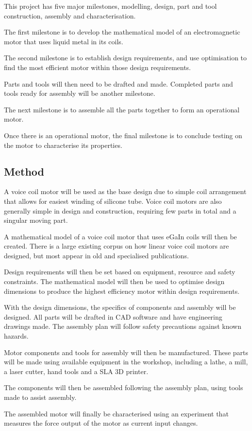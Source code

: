 \documentclass[a4paper,12pt]{article}
\begin{document}
This project has five major milestones, modelling, design, part and tool construction, assembly and characterisation.

The first milestone is to develop the mathematical model of an electromagnetic motor that uses liquid metal in its coils.

The second milestone is to establish design requirements, and use optimisation to find the most efficient motor within those design requirements.

Parts and tools will then need to be drafted and made. Completed parts and tools ready for assembly will be another milestone.

The next milestone is to assemble all the parts together to form an operational motor.

Once there is an operational motor, the final milestone is to conclude testing on the motor to characterise its properties.

\subsection{Method}
A voice coil motor will be used as the base design due to simple coil arrangement that allows for easiest winding of silicone tube. Voice coil motors are also generally simple in design and construction, requiring few parts in total and a singular moving part.

A mathematical model of a voice coil motor that uses eGaIn coils will then be created. There is a large existing corpus on how linear voice coil motors are designed, but most appear in old and specialised publications.

Design requirements will then be set based on equipment, resource and safety constraints. The mathematical model will then be used to optimise design dimensions to produce the highest efficiency motor within design requirements.

With the design dimensions, the specifics of components and assembly will be designed. All parts will be drafted in CAD software and have engineering drawings made. The assembly plan will follow safety precautions against known hazards.

Motor components and tools for assembly will then be manufactured. These parts will be made using available equipment in the workshop, including a lathe, a mill, a laser cutter, hand tools and a SLA 3D printer.

The components will then be assembled following the assembly plan, using tools made to assist assembly.

The assembled motor will finally be characterised using an experiment that measures the force output of the motor as current input changes.

\newpage

\printbibliography
\end{document}
